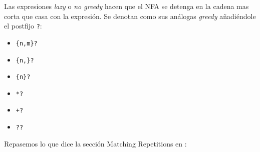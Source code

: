 
\label{section:nogreedy}
Las expresiones \emph{lazy} o \emph{no greedy} hacen que el NFA se detenga en la cadena mas corta que 
casa con la expresión. Se denotan como sus análogas \emph{greedy} añadiéndole el
postfijo \verb|?|:

\begin{itemize}
\item \verb|{n,m}?|
\item \verb|{n,}?|
\item \verb|{n}?|
\item \verb|*?|
\item \verb|+?|
\item \verb|??|
\end{itemize}

Repasemos lo que dice la sección Matching Repetitions en :
